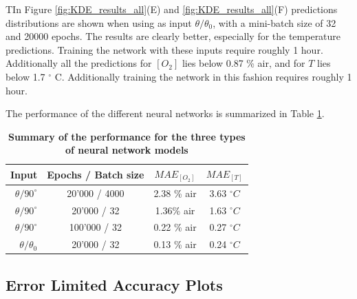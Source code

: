 \documentclass[9pt,twocolumn,twoside,pdftex]{optica}
\begin{document}
TIn Figure \ref{fig:KDE_results_all}(E) and \ref{fig:KDE_results_all}(F) predictions distributions are shown when using as input $\theta/\theta_0$, with a mini-batch size of 32 and 20000 epochs. The results are clearly better, especially for the temperature predictions. Training the network with these inputs require roughly 1 hour. Additionally all the predictions for $[O_2]$ lies below 0.87 \% air, and for $T$ lies below 1.7 $^\circ$ C. Additionally training the network in this fashion requires roughly 1 hour. 




The performance of the different neural networks is summarized in Table \ref{TableMAE_summary}. 
\begin{table}[hbt]
\centering
\caption {\bf Summary of the performance for the three types of neural network models}

\begin{tabular}{ rccc}
\smallskip 
 Input & Epochs / Batch size & $MAE_{[O_2]}$ & $MAE_{[T]}$  \\ 
 \hline
$\theta / 90^\circ$ & 20'000 / 4000 & 2.38 \% air & 3.63 $^\circ C$\\ 
$\theta / 90^\circ$ & 20'000 / 32 & 1.36\% air & 1.63 $^\circ C$\\ 
$\theta / 90^\circ$& 100'000 / 32 & 0.22 \% air & 0.27 $^\circ C$\\ 
$\theta /\theta_0$ & 20'000 / 32 & 0.13 \% air & 0.24 $^\circ C$\\ 

\end{tabular}
\label{TableMAE_summary}
\end{table}

\subsection{Error Limited Accuracy Plots}
\end{document}
